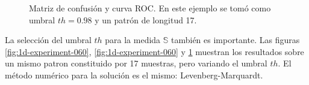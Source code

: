 \begin{figure}
	\centering
	\caption{Matriz de confusión y curva ROC. En este ejemplo se tomó como umbral $th=0.98$ y un patrón de longitud 17.} \label{fig:1d-experiment-098}
\end{figure}

La selección del umbral $th$ para la medida $\mathbb{S}$ también es importante.
Las figuras \ref{fig:1d-experiment-060}, \ref{fig:1d-experiment-060} y \ref{fig:1d-experiment-098} muestran los resultados 
sobre un mismo patron constituido por 17 muestras, pero variando el umbral $th$. El método numérico para la solución es el
mismo: Levenberg-Marquardt.

